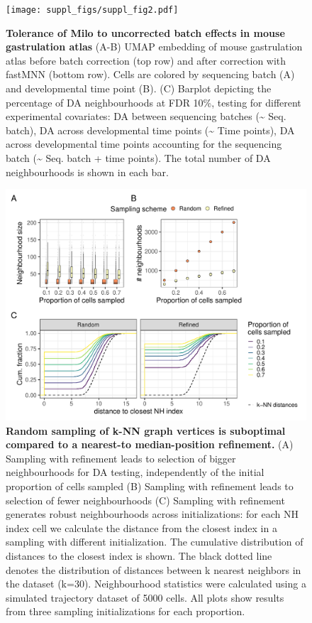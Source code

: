 \documentclass[
]{article}
\begin{document}
\begin{figure}
\centering
\texttt{[image: suppl\_figs/suppl\_fig2.pdf]}
\caption{\label{fig:sup-fig-2}\textbf{Tolerance of Milo to uncorrected batch effects in mouse gastrulation atlas}
(A-B) UMAP embedding of mouse gastrulation atlas before batch correction (top row) and after correction with fastMNN (bottom row). Cells are colored by sequencing batch (A) and developmental time point (B).
(C) Barplot depicting the percentage of DA neighbourhoods at FDR 10\%, testing for different experimental covariates: DA between sequencing batches (\textasciitilde{} Seq. batch), DA across developmental time points (\textasciitilde{} Time points), DA across developmental time points accounting for the sequencing batch (\textasciitilde{} Seq. batch + time points). The total number of DA neighbourhoods is shown in each bar.}
\end{figure}





\begin{figure}
\centering
\includegraphics{suppl_figs/suppl_fig3.pdf}
\caption{\label{fig:sup-fig-3}\textbf{Random sampling of k-NN graph vertices is suboptimal compared to a nearest-to median-position refinement.}
(A) Sampling with refinement leads to selection of bigger neighbourhoods for DA testing, independently of the initial proportion of cells sampled
(B) Sampling with refinement leads to selection of fewer neighbourhoods
(C) Sampling with refinement generates robust neighbourhoods across initializations: for each NH index cell we calculate the distance from the closest index in a sampling with different initialization. The cumulative distribution of distances to the closest index is shown. The black dotted line denotes the distribution of distances between k nearest neighbors in the dataset (k=30).
Neighbourhood statistics were calculated using a simulated trajectory dataset of 5000 cells. All plots show results from three sampling initializations for each proportion.}
\end{figure}
\end{document}
